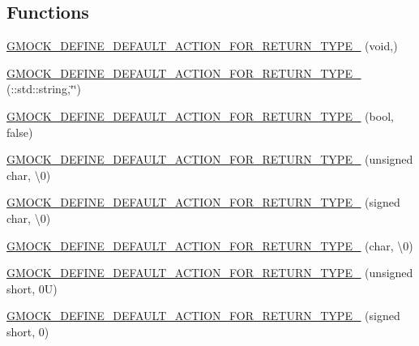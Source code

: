 \subsection*{Functions}
\begin{DoxyCompactItemize}
\item 
\hyperlink{namespacetesting_1_1internal_a8fe6f7c11d6d3dd6e42b75c9a5b43861}{G\+M\+O\+C\+K\+\_\+\+D\+E\+F\+I\+N\+E\+\_\+\+D\+E\+F\+A\+U\+L\+T\+\_\+\+A\+C\+T\+I\+O\+N\+\_\+\+F\+O\+R\+\_\+\+R\+E\+T\+U\+R\+N\+\_\+\+T\+Y\+P\+E\+\_\+} (void,)
\item 
\hyperlink{namespacetesting_1_1internal_a8b2b1008acaca5ba1f46998a3ae6a3ec}{G\+M\+O\+C\+K\+\_\+\+D\+E\+F\+I\+N\+E\+\_\+\+D\+E\+F\+A\+U\+L\+T\+\_\+\+A\+C\+T\+I\+O\+N\+\_\+\+F\+O\+R\+\_\+\+R\+E\+T\+U\+R\+N\+\_\+\+T\+Y\+P\+E\+\_\+} (\+::std\+::string,\char`\"{}\char`\"{})
\item 
\hyperlink{namespacetesting_1_1internal_aa6670915f42119e4ba20d8cb74fc1eea}{G\+M\+O\+C\+K\+\_\+\+D\+E\+F\+I\+N\+E\+\_\+\+D\+E\+F\+A\+U\+L\+T\+\_\+\+A\+C\+T\+I\+O\+N\+\_\+\+F\+O\+R\+\_\+\+R\+E\+T\+U\+R\+N\+\_\+\+T\+Y\+P\+E\+\_\+} (bool, false)
\item 
\hyperlink{namespacetesting_1_1internal_ab203e2c4c54f2ca86439344347a3e43f}{G\+M\+O\+C\+K\+\_\+\+D\+E\+F\+I\+N\+E\+\_\+\+D\+E\+F\+A\+U\+L\+T\+\_\+\+A\+C\+T\+I\+O\+N\+\_\+\+F\+O\+R\+\_\+\+R\+E\+T\+U\+R\+N\+\_\+\+T\+Y\+P\+E\+\_\+} (unsigned char, \textquotesingle{}\textbackslash{}0\textquotesingle{})
\item 
\hyperlink{namespacetesting_1_1internal_aaedb3b1b5307625bc84dc660742da3c6}{G\+M\+O\+C\+K\+\_\+\+D\+E\+F\+I\+N\+E\+\_\+\+D\+E\+F\+A\+U\+L\+T\+\_\+\+A\+C\+T\+I\+O\+N\+\_\+\+F\+O\+R\+\_\+\+R\+E\+T\+U\+R\+N\+\_\+\+T\+Y\+P\+E\+\_\+} (signed char, \textquotesingle{}\textbackslash{}0\textquotesingle{})
\item 
\hyperlink{namespacetesting_1_1internal_aeaaa7101572f283fe70a85ad5e6c65dc}{G\+M\+O\+C\+K\+\_\+\+D\+E\+F\+I\+N\+E\+\_\+\+D\+E\+F\+A\+U\+L\+T\+\_\+\+A\+C\+T\+I\+O\+N\+\_\+\+F\+O\+R\+\_\+\+R\+E\+T\+U\+R\+N\+\_\+\+T\+Y\+P\+E\+\_\+} (char, \textquotesingle{}\textbackslash{}0\textquotesingle{})
\item 
\hyperlink{namespacetesting_1_1internal_ab2965a6078670393812e67f8e5fcb072}{G\+M\+O\+C\+K\+\_\+\+D\+E\+F\+I\+N\+E\+\_\+\+D\+E\+F\+A\+U\+L\+T\+\_\+\+A\+C\+T\+I\+O\+N\+\_\+\+F\+O\+R\+\_\+\+R\+E\+T\+U\+R\+N\+\_\+\+T\+Y\+P\+E\+\_\+} (unsigned short, 0\+U)
\item 
\hyperlink{namespacetesting_1_1internal_ae6ea5db83b290e2412f321c3b1eb8c47}{G\+M\+O\+C\+K\+\_\+\+D\+E\+F\+I\+N\+E\+\_\+\+D\+E\+F\+A\+U\+L\+T\+\_\+\+A\+C\+T\+I\+O\+N\+\_\+\+F\+O\+R\+\_\+\+R\+E\+T\+U\+R\+N\+\_\+\+T\+Y\+P\+E\+\_\+} (signed short, 0)

\end{DoxyCompactItemize}
